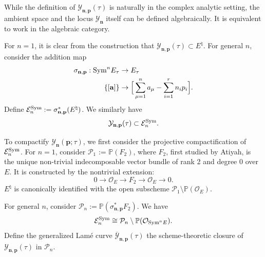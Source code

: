 \documentclass[11pt]{amsart}
\theoremstyle{remark}
\numberwithin{equation}{section}
\newcommand{\Sym}{{\rm Sym}}
\begin{document}
\vspace{8pt} 
While the definition of $\mathcal{Y}_{\mathbf{n},\mathbf{p}}(\tau)$ is naturally in the complex analytic setting, the ambient space and the locus $\mathcal{Y}_{\mathbf{n}}$ itself can be defined algebraically. It is equivalent to work in the algebraic category.

For $n=1$, it is clear from the construction that $\mathcal{Y}_{\mathbf{n},\mathbf{p}}(\tau) \subset E^{\natural}$. 
For general $n$, consider the addition map 
\[
\begin{split}
\sigma_{\mathbf{n},\mathbf{p}} : \Sym^n E_\tau &\rightarrow E_\tau
\\
\{[\mathbf{a}]\} &\rightarrow \Big[\sum_{\mu=1}^n a_{\mu} - \sum_{i=1}^r n_ip_i \Big].
\end{split}
\]
Define $\mathcal{E}_n^{\rm Sym} := \sigma_{\mathbf{n},\mathbf{p}}^*(E^{\natural})$. We similarly have
\[
    \mathcal{Y}_{\mathbf{n},\mathbf{p}}(\tau) \subset \mathcal{E}_n^{\rm Sym}.
\]

To compactify $\mathcal{Y}_{\mathbf{n}}(\mathbf{p};\tau)$, we first consider the projective compactification of $\mathcal{E}_n^{\Sym}$. 
For $n=1$, consider $\mathcal{P}_1$ := $\mathbb{P}(F_2)$, where $F_2$, first studied by Atiyah, is the unique non-trivial indecomposable vector bundle of rank 2 and degree 0 over $E$. It is constructed by the nontrivial extension: 
\[
    0 \rightarrow \mathcal O_E \rightarrow F_2 \rightarrow \mathcal O_E \rightarrow 0.  
\]
$E^{\natural}$ is canonically identified with the open subscheme $\mathcal{P}_1 \setminus \mathbb{P}(\mathcal{O}_E)$.

For general $n$, consider $\mathcal{P}_n := \mathbb{P} ( \sigma_{\mathbf{n},\mathbf{p}}^* F_2 ) $. We have
\[
\mathcal{E}_n^{\rm Sym} \cong \mathcal{P}_n \setminus \mathbb{P}(\mathcal{O}_{{\rm Sym}^n E}).
\]
Define the generalized Lam\'e curve $\overline{\mathcal{Y}}_{\mathbf{n},\mathbf{p}}(\tau)$ the scheme-theoretic closure of $\mathcal{Y}_{\mathbf{n},\mathbf{p}}(\tau)$ in $\mathcal{P}_n$.
\end{document}
